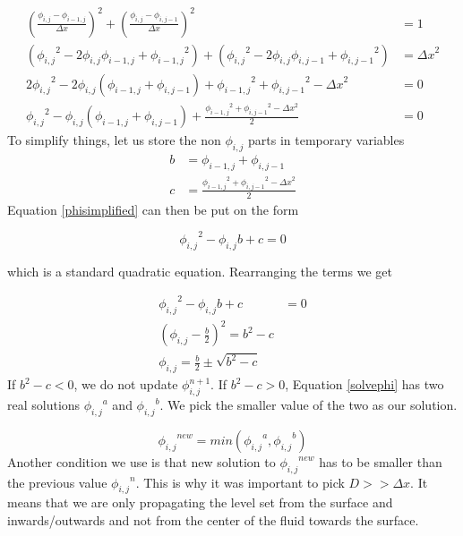 \begin{equation}
\begin{split}
{(\frac{\phi_{i,j} - \phi_{i-1,j}}{\Delta x})}^2 + {(\frac{\phi_{i,j} - \phi_{i,j-1}}{\Delta x})}^2 &= 1 \\ 
({\phi_{i,j}}^2 - 2\phi_{i,j}\phi_{i-1,j} + {\phi_{i-1,j}}^2) + 
({\phi_{i,j}}^2 - 2\phi_{i,j}\phi_{i,j-1} + {\phi_{i,j-1}}^2)
&= {\Delta x}^2 \\
2{\phi_{i,j}}^2 - 2\phi_{i,j}(\phi_{i-1,j} + \phi_{i,j-1}) + {\phi_{i-1,j}}^2 + {\phi_{i,j-1}}^2 - {\Delta x}^2 &= 0 \\
{\phi_{i,j}}^2 - \phi_{i,j}(\phi_{i-1,j} + \phi_{i,j-1}) + \frac{{\phi_{i-1,j}}^2 + {\phi_{i,j-1}}^2 - {\Delta x}^2}{2} &= 0
\end{split}
\label{phisimplified}
\end{equation}
\noindent
To simplify things, let us store the non $\phi_{i,j}$ parts in temporary variables
\begin{equation}
\begin{split}
b &= \phi_{i-1,j} + \phi_{i,j-1} \\
c &= \frac{{\phi_{i-1,j}}^2 + {\phi_{i,j-1}}^2 - {\Delta x}^2}{2}
\end{split}
\label{variablesreinit}
\end{equation}
\noindent
Equation \ref{phisimplified} can then be put on the form

\begin{equation} 
{\phi_{i,j}}^2 - \phi_{i,j} b + c = 0
\end{equation}

which is a standard quadratic equation. Rearranging the terms we get

\begin{equation} 
\begin{split}
{\phi_{i,j}}^2 - \phi_{i,j} b + c &= 0 \\
{(\phi_{i,j} - \frac{b}{2})}^2  = b^2 - c \\
\phi_{i,j} =  \frac{b}{2} \pm \sqrt{b^2 - c}
\end{split}
\label{solvephi}
\end{equation}
\noindent
If $b^2 - c < 0$, we do not update $\phi_{i,j}^{n+1}$. If $b^2 - c > 0$, Equation \ref{solvephi} has two real solutions ${\phi_{i,j}}^a$ and ${\phi_{i,j}}^b$. We pick the smaller value of the two as our solution. 

\begin{equation}
{\phi_{i,j}}^{new} = min({\phi_{i,j}}^a, {\phi_{i,j}}^b)
\end{equation}
\noindent
Another condition we use is that new solution to ${\phi_{i,j}}^{new}$ has to be smaller than the previous value ${\phi_{i,j}}^{n}$. This is why it was important to pick $D >> \Delta x$. It means that we are only propagating the level set from the surface and inwards/outwards and not from the center of the fluid towards the surface.

